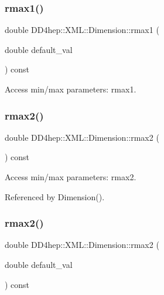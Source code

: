 \subsubsection{\texorpdfstring{rmax1()}{rmax1()}\hspace{0.1cm}{\footnotesize\ttfamily [2/2]}}
{\footnotesize\ttfamily double D\+D4hep\+::\+X\+M\+L\+::\+Dimension\+::rmax1 (\begin{DoxyParamCaption}\item[{double}]{default\+\_\+val }\end{DoxyParamCaption}) const}



Access min/max parameters\+: rmax1. 

\hypertarget{struct_d_d4hep_1_1_x_m_l_1_1_dimension_a165e140ba68be7de60c20fec5a785980}{}\label{struct_d_d4hep_1_1_x_m_l_1_1_dimension_a165e140ba68be7de60c20fec5a785980} 
\subsubsection{\texorpdfstring{rmax2()}{rmax2()}\hspace{0.1cm}{\footnotesize\ttfamily [1/2]}}
{\footnotesize\ttfamily double D\+D4hep\+::\+X\+M\+L\+::\+Dimension\+::rmax2 (\begin{DoxyParamCaption}{ }\end{DoxyParamCaption}) const}



Access min/max parameters\+: rmax2. 



Referenced by Dimension().

\hypertarget{struct_d_d4hep_1_1_x_m_l_1_1_dimension_a1dc3d4e014e5bc53d68e6d4ceb6921f3}{}\label{struct_d_d4hep_1_1_x_m_l_1_1_dimension_a1dc3d4e014e5bc53d68e6d4ceb6921f3} 
\subsubsection{\texorpdfstring{rmax2()}{rmax2()}\hspace{0.1cm}{\footnotesize\ttfamily [2/2]}}
{\footnotesize\ttfamily double D\+D4hep\+::\+X\+M\+L\+::\+Dimension\+::rmax2 (\begin{DoxyParamCaption}\item[{double}]{default\+\_\+val }\end{DoxyParamCaption}) const}



